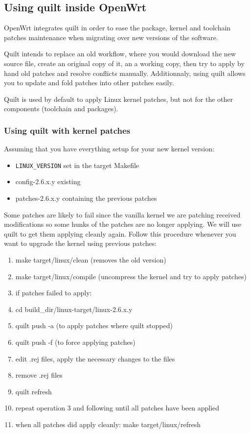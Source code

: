 \subsection{Using quilt inside OpenWrt}

OpenWrt integrates quilt in order to ease the package, kernel and toolchain
patches maintenance when migrating over new versions of the software.

Quilt intends to replace an old workflow, where you would download the new
source file, create an original copy of it, an a working copy, then try to
apply by hand old patches and resolve conflicts manually. Additionnaly, using
quilt allows you to update and fold patches into other patches easily.

Quilt is used by default to apply Linux kernel patches, but not for the other
components (toolchain and packages).

\subsubsection{Using quilt with kernel patches}

Assuming that you have everything setup for your new kernel version:
\begin{itemize}
\item \texttt{LINUX\_VERSION} set in the target Makefile
\item config-2.6.x.y existing
\item patches-2.6.x.y containing the previous patches
\end{itemize}

Some patches are likely to fail since the vanilla kernel we are patching
received modifications so some hunks of the patches are no longer applying.
We will use quilt to get them applying cleanly again. Follow this procedure
whenever you want to upgrade the kernel using previous patches:

\begin{enumerate}
\item make target/linux/clean (removes the old version)
\item make target/linux/compile (uncompress the kernel and try to apply patches)
\item if patches failed to apply:
\item cd build\_dir/linux-target/linux-2.6.x.y
\item quilt push -a (to apply patches where quilt stopped)
\item quilt push -f (to force applying patches)
\item edit .rej files, apply the necessary changes to the files
\item remove .rej files
\item quilt refresh
\item repeat operation 3 and following until all patches have been applied
\item when all patches did apply cleanly: make target/linux/refresh
\end{enumerate}

